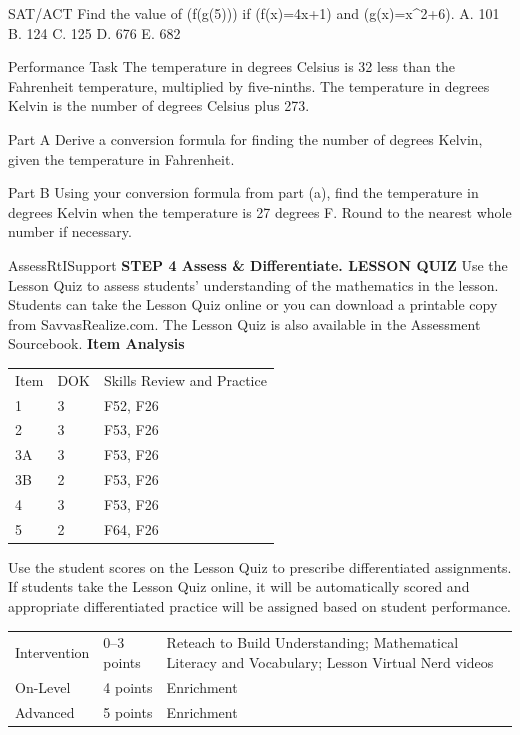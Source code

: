 \documentclass{article}
\newenvironment{practice}[2]{}{}        %
\newenvironment{te-addendum}[2]{}{}     %
\newcommand{\answer}[1]{}               %
\newcommand{\placeholder}[2]{}          %
\begin{document}
\begin{practice}{35}{1}
SAT/ACT Find the value of (f(g(5))) if (f(x)=4x+1) and (g(x)=x^2+6).
A. 101
B. 124
C. 125
D. 676
E. 682
\answer{C}
\end{practice}
\begin{practice}{36}{2}
Performance Task The temperature in degrees Celsius is 32 less than the Fahrenheit temperature, multiplied by five-ninths. The temperature in degrees Kelvin is the number of degrees Celsius plus 273.
\placeholder{diagram}{Three vertical thermometers labeled Celsius, degrees C; Fahrenheit, degrees F; Kelvin, K. Orange horizontal reference line aligns 0 degrees C, 32 degrees F and 273 K. Celsius scale labels -40,-20,0 degrees C,20,40,60, small ticks every 5; Fahrenheit labels -50,-25,0,25,50,75,100,125,150, small ticks every 5; Kelvin labels 230,250,270,290,310,330, small ticks every 5. Black columns inside pale blue thermometer backgrounds.}
Part A Derive a conversion formula for finding the number of degrees Kelvin, given the temperature in Fahrenheit.
\answer{Part A (K=\frac59(F-32)+273)}
Part B Using your conversion formula from part (a), find the temperature in degrees Kelvin when the temperature is 27 degrees F. Round to the nearest whole number if necessary.
\answer{Part B 270 K}
\end{practice}
\begin{te-addendum}{Assess}{RtISupport}
\textbf{STEP 4 Assess & Differentiate. LESSON QUIZ}
Use the Lesson Quiz to assess students' understanding of the mathematics in the lesson.
Students can take the Lesson Quiz online or you can download a printable copy from SavvasRealize.com. The Lesson Quiz is also available in the Assessment Sourcebook.
\textbf{Item Analysis}
\begin{tabular}{lll}
Item & DOK & Skills Review and Practice \\
1 & 3 & F52, F26 \\
2 & 3 & F53, F26 \\
3A & 3 & F53, F26 \\
3B & 2 & F53, F26 \\
4 & 3 & F53, F26 \\
5 & 2 & F64, F26 \\
\end{tabular}
Use the student scores on the Lesson Quiz to prescribe differentiated assignments.
If students take the Lesson Quiz online, it will be automatically scored and appropriate differentiated practice will be assigned based on student performance.
\begin{tabular}{lll}
Intervention & 0--3 points & Reteach to Build Understanding; Mathematical Literacy and Vocabulary; Lesson Virtual Nerd videos \\
On-Level & 4 points & Enrichment \\
Advanced & 5 points & Enrichment \\
\end{tabular}
\end{te-addendum}
\end{document}

